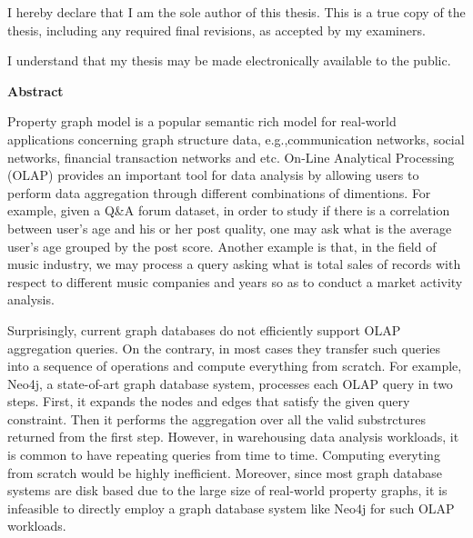 \cleardoublepage %
 


  \noindent
I hereby declare that I am the sole author of this thesis. This is a true copy of the thesis, including any required final revisions, as accepted by my examiners.

  \bigskip
  
  \noindent
I understand that my thesis may be made electronically available to the public.

\cleardoublepage


\begin{center}\textbf{Abstract}\end{center}


Property graph model is a popular semantic rich model for real-world applications concerning graph structure data, e.g.,communication networks, social networks, financial transaction networks and etc. On-Line Analytical Processing (OLAP) provides an important tool for data analysis by allowing users to perform data aggregation through different combinations of dimentions. For example, given a Q\&A forum dataset, in order to study if there is a correlation between user's age and his or her post quality, one may ask what is the average user's age grouped by the post score. Another example is that, in the field of music industry, we may process a query asking what is total sales of records with respect to different music companies and years so as to conduct a market activity analysis.


Surprisingly, current graph databases do not efficiently support OLAP aggregation queries. On the contrary, in most cases they transfer such queries into a sequence of operations and compute everything from scratch. For example, Neo4j, a state-of-art graph database system, processes each OLAP query in two steps. First, it expands the nodes and edges that satisfy the given query constraint. Then it performs the aggregation over all the valid substrctures returned from the first step. However, in warehousing data analysis workloads, it is common to have repeating queries from time to time. Computing everyting from scratch would be highly inefficient. Moreover, since most graph database systems are disk based due to the large size of real-world property graphs, it is infeasible to directly employ a graph database system like Neo4j for such OLAP workloads. %


